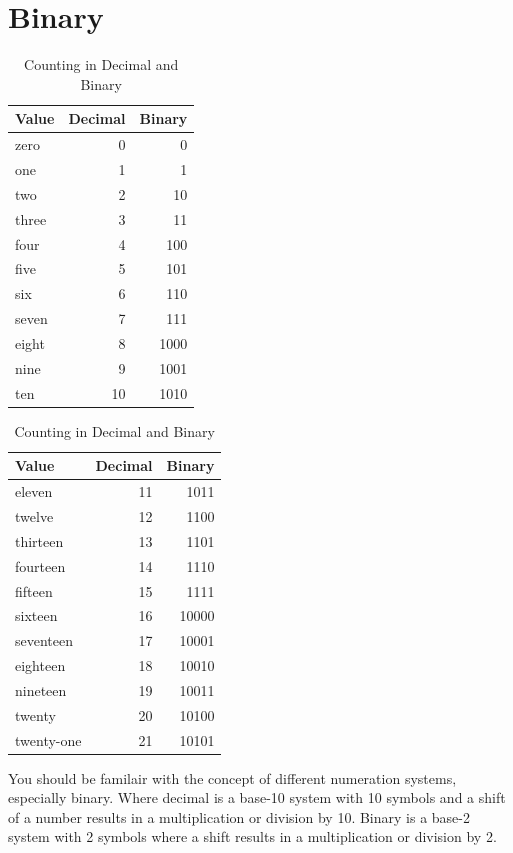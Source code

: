 \documentclass[12pt, a4paper, oneside]{memoir}
\begin{document}
\section{Binary}
\begin{table}[h]
  \caption{Counting in Decimal and Binary}
  \centering
  \begin{tabularx}{0.48\textwidth}{Xrr}
    Value & Decimal & \hspace{0.05\textwidth} Binary \\
    \midrule
    zero & 0 & 0 \\
    one & 1 & 1 \\
    two & 2 & 10 \\
    three & 3 & 11 \\
    four & 4 & 100 \\
    five & 5 & 101 \\
    six & 6 & 110 \\
    seven & 7 & 111 \\
    eight & 8 & 1000 \\
    nine & 9 & 1001 \\
    ten & 10 & 1010 \\
    \bottomrule
  \end{tabularx}
  \hspace{0.02\textwidth}
  \begin{tabularx}{0.48\textwidth}{Xrr}
    Value & Decimal & \hspace{0.05\textwidth} Binary \\
    \midrule
    eleven & 11 & 1011 \\
    twelve & 12 & 1100 \\
    thirteen & 13 & 1101 \\
    fourteen & 14 & 1110 \\
    fifteen & 15 & 1111 \\
    sixteen & 16 & 10000 \\
    seventeen & 17 & 10001 \\
    eighteen & 18 & 10010 \\
    nineteen & 19 & 10011 \\
    twenty & 20 & 10100 \\
    twenty-one & 21 & 10101 \\
    \bottomrule
  \end{tabularx}
\end{table}
\noindent
You should be familair with the concept of different numeration systems, especially binary.
Where decimal is a base-10 system with 10 symbols and a shift of a number results in a multiplication or division by 10.
Binary is a base-2 system with 2 symbols where a shift results in a multiplication or division by 2.
\end{document}
